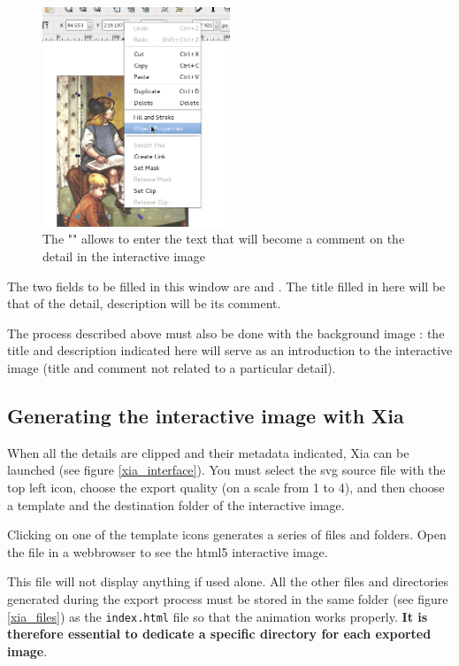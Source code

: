 \begin{figure}[htp]
 \centering
 \includegraphics[width=0.5\textwidth, clip=true, trim=0mm 60mm 0mm 0mm]{./images/proprietes_objet}
 \caption[The "Object Properties" of the detail in Inkscape]{The "" allows to enter the text that will become a  comment on the detail in the interactive image}
 \label{objet_properties}
\end{figure}

The two fields to be filled in this window are  and 
.  The title filled in here will be that of the detail, 
description will be its comment.

The process described above must also be done with the background image : 
the title and description indicated here will serve as an introduction to 
the interactive image (title and comment not related to a particular detail).

\subsection{Generating the interactive image with Xia}

When all the details are clipped and their metadata indicated, Xia can be launched (see figure \ref{xia_interface}). You must select the svg source file with the top left icon,
choose the export quality (on a scale from 1 to 4), and then choose a 
template and the destination folder of the interactive image.

Clicking on one of the template icons generates a series of files and folders.
 Open the  file in a 
  webbrowser to see the html5 interactive image.

\begin{alerte}
This file will not display anything if used 
alone. All the other files and directories generated during the export process 
must be stored in  the same folder (see figure \ref{xia_files}) as the \texttt{index.html} file so that the animation works properly. \textbf{It is therefore essential to 
dedicate a specific directory for each exported image}.
\end{alerte}

